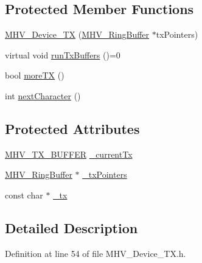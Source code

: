\subsection*{\-Protected \-Member \-Functions}
\begin{DoxyCompactItemize}
\item 
\hyperlink{class_m_h_v___device___t_x_a5d0f9d3e6d14e5d3edb48fdc0f668c95}{\-M\-H\-V\-\_\-\-Device\-\_\-\-T\-X} (\hyperlink{class_m_h_v___ring_buffer}{\-M\-H\-V\-\_\-\-Ring\-Buffer} $\ast$tx\-Pointers)
\item 
virtual void \hyperlink{class_m_h_v___device___t_x_a3a86067d417c3d5a1f64042ecfcefff7}{run\-Tx\-Buffers} ()=0
\item 
bool \hyperlink{class_m_h_v___device___t_x_a64cba701f06476b494a97620e1a26e86}{more\-T\-X} ()
\item 
int \hyperlink{class_m_h_v___device___t_x_a9e9f436d2b41766db5225c504af96ef5}{next\-Character} ()
\end{DoxyCompactItemize}
\subsection*{\-Protected \-Attributes}
\begin{DoxyCompactItemize}
\item 
\hyperlink{_m_h_v___device___t_x_8h_a8f969362e45e1a805a4a189101bd1f97}{\-M\-H\-V\-\_\-\-T\-X\-\_\-\-B\-U\-F\-F\-E\-R} \hyperlink{class_m_h_v___device___t_x_af2764653ba9f0b2a59bbca39f3987a74}{\-\_\-current\-Tx}
\item 
\hyperlink{class_m_h_v___ring_buffer}{\-M\-H\-V\-\_\-\-Ring\-Buffer} $\ast$ \hyperlink{class_m_h_v___device___t_x_a54a8220b648f9e89a11e8273f91e75fb}{\-\_\-tx\-Pointers}
\item 
const char $\ast$ \hyperlink{class_m_h_v___device___t_x_ace8827a700dcc1a6a54e0bf80906085c}{\-\_\-tx}
\end{DoxyCompactItemize}


\subsection{\-Detailed \-Description}


\-Definition at line 54 of file \-M\-H\-V\-\_\-\-Device\-\_\-\-T\-X.\-h.



